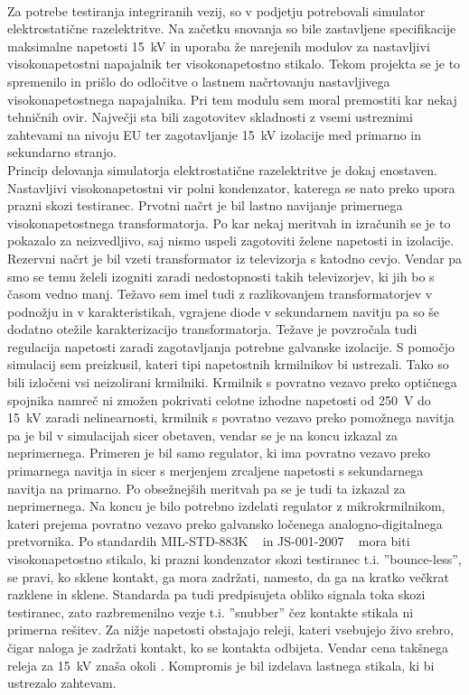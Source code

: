 \documentclass[a4paper,twoside,openright,12pt,Slovene]{book}
\begin{document}
~\\Za potrebe testiranja integriranih vezij, so v podjetju potrebovali simulator elektrostatične razelektritve. Na začetku snovanja so bile zastavljene specifikacije maksimalne napetosti \SI{15}{\kilo\volt} in uporaba že narejenih modulov za nastavljivi visokonapetostni napajalnik ter visokonapetostno stikalo. Tekom projekta se je to spremenilo in prišlo do odločitve o lastnem načrtovanju nastavljivega visokonapetostnega napajalnika. Pri tem modulu sem moral premostiti kar nekaj tehničnih ovir. Največji sta bili zagotovitev skladnosti z vsemi ustreznimi zahtevami na nivoju EU ter zagotavljanje \SI{15}{\kilo\volt} izolacije med primarno in sekundarno stranjo.   
~\\Princip delovanja simulatorja elektrostatične razelektritve je dokaj enostaven. Nastavljivi visokonapetostni vir polni kondenzator, katerega se nato preko upora prazni skozi testiranec.    
Prvotni načrt je bil lastno navijanje primernega visokonapetostnega transformatorja. Po kar nekaj meritvah in izračunih se je to pokazalo za neizvedljivo, saj nismo uspeli zagotoviti želene napetosti in izolacije. Rezervni načrt je bil vzeti transformator iz televizorja s katodno cevjo. Vendar pa smo se temu želeli izogniti zaradi nedostopnosti takih televizorjev, ki jih bo s časom vedno manj. Težavo sem imel tudi z razlikovanjem transformatorjev v podnožju in v karakteristikah, vgrajene diode v sekundarnem navitju pa so še dodatno otežile karakterizacijo transformatorja. 
Težave je povzročala tudi regulacija napetosti zaradi zagotavljanja potrebne galvanske izolacije. S pomočjo simulacij sem preizkusil, kateri tipi napetostnih krmilnikov bi ustrezali. Tako so bili izločeni vsi neizolirani krmilniki. Krmilnik s povratno vezavo preko optičnega spojnika namreč ni zmožen pokrivati celotne izhodne napetosti od \SI{250}{\volt} do \SI{15}{\kilo\volt} zaradi nelinearnosti, krmilnik s povratno vezavo preko pomožnega navitja pa je bil v simulacijah sicer obetaven, vendar se je na koncu izkazal za neprimernega. Primeren je bil samo regulator, ki ima povratno vezavo preko primarnega navitja in sicer s merjenjem zrcaljene napetosti s sekundarnega navitja na primarno. Po obsežnejših meritvah pa se je tudi ta izkazal za neprimernega. Na koncu je bilo potrebno izdelati regulator z mikrokrmilnikom, kateri prejema povratno vezavo preko galvansko ločenega analogno-digitalnega pretvornika.
Po standardih MIL-STD-883K ~\cite{MIL-STD-883K} in JS-001-2007 ~\cite{JS-001-2017} mora biti visokonapetostno stikalo, ki prazni kondenzator skozi testiranec t.i. ''bounce-less'', se pravi, ko sklene kontakt, ga mora zadržati, namesto, da ga na kratko večkrat razklene in sklene. Standarda pa tudi predpisujeta obliko signala toka skozi testiranec, zato razbremenilno vezje t.i. ''snubber'' čez kontakte stikala ni primerna rešitev. Za nižje napetosti obstajajo releji, kateri vsebujejo živo srebro, čigar naloga je zadržati kontakt, ko se kontakta odbijeta. Vendar cena takšnega releja za \SI{15}{\kilo\volt} znaša okoli .
Kompromis je bil izdelava lastnega stikala, ki bi ustrezalo zahtevam.
\end{document}
